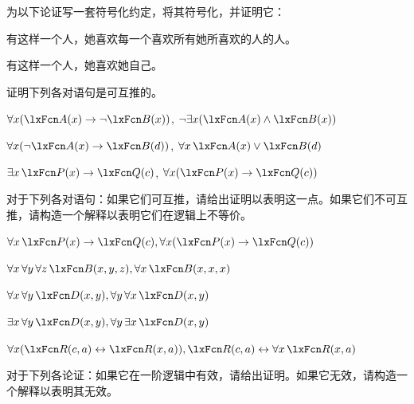 \solutions
\problempart
\label{pr.likes}
为以下论证写一套符号化约定，将其符号化，并证明它：


\begin{earg}
\item 有这样一个人，她喜欢每一个喜欢所有她所喜欢的人的人。
\item[\texttherefore] 有这样一个人，她喜欢她自己。
\end{earg}

\problempart
证明下列各对语句是可互推的。


\begin{compactlist}
\item $\forall x (\atom{A}{x}\eif \enot \atom{B}{x})$, $\enot\exists x(\atom{A}{x} \eand \atom{B}{x})$
\item $\forall x (\enot\atom{A}{x}\eif \atom{B}{d})$, $\forall x\,\atom{A}{x} \eor \atom{B}{d}$
\item $\exists x\,\atom{P}{x} \eif \atom{Q}{c}$, $\forall x (\atom{P}{x} \eif \atom{Q}{c})$
\end{compactlist}

\solutions
\problempart
\label{pr.FOLequivornot}
对于下列各对语句：如果它们可互推，请给出证明以表明这一点。如果它们不可互推，请构造一个解释以表明它们在逻辑上不等价。


\begin{compactlist}
\item $\forall x\,\atom{P}{x} \eif \atom{Q}{c}, \forall x (\atom{P}{x} \eif \atom{Q}{c})$
\item $\forall x\,\forall y\, \forall z\,\atom{B}{x,y,z}, \forall x\,\atom{B}{x,x,x}$
\item $\forall x\,\forall y\,\atom{D}{x,y}, \forall y\,\forall x\,\atom{D}{x,y}$
\item $\exists x\,\forall y\,\atom{D}{x,y}, \forall y\,\exists x\,\atom{D}{x,y}$
\item $\forall x (\atom{R}{c,a} \eiff \atom{R}{x,a}), \atom{R}{c,a} \eiff \forall x\,\atom{R}{x,a}$
\end{compactlist}

\solutions
\problempart
\label{pr.FOLvalidornot}
对于下列各论证：如果它在一阶逻辑中有效，请给出证明。如果它无效，请构造一个解释以表明其无效。


